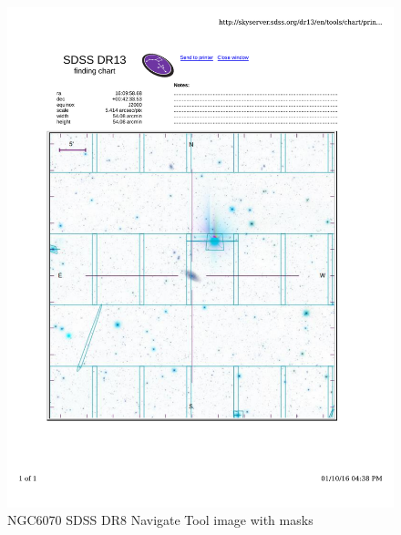 \documentclass[10pt,letterpaper]{article}
\begin{document}
\begin{figure}[h!]
\centering
\includegraphics[scale=0.7]{figures/NGC6070.pdf}
\caption{NGC6070 SDSS DR8 Navigate Tool image with masks}
\end{figure}
\end{document}
